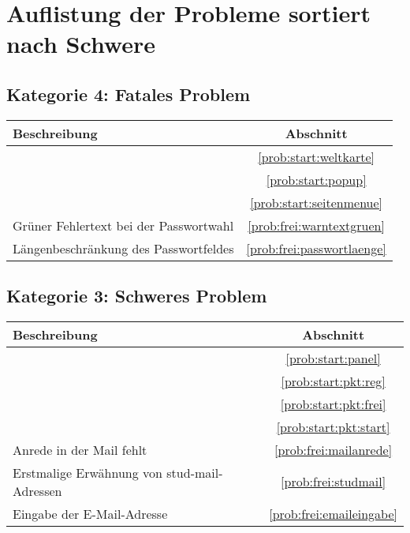 \section{Auflistung der Probleme sortiert nach Schwere}

\subsection*{Kategorie 4: Fatales Problem}
\begin{tabular}{|p{12cm}|c|}
\hline
\textbf{Beschreibung} & \textbf{Abschnitt} \\
\hline\hline
\nameref{prob:start:weltkarte} & \ref{prob:start:weltkarte} \\ 
\nameref{prob:start:popup} & \ref{prob:start:popup}\\
\nameref{prob:start:seitenmenue} & \ref{prob:start:seitenmenue}\\
Grüner Fehlertext bei der Passwortwahl & \ref{prob:frei:warntextgruen}\\
Längenbeschränkung des Passwortfeldes & \ref{prob:frei:passwortlaenge}\\
\hline
\end{tabular}

\subsection*{Kategorie 3: Schweres Problem}
\begin{tabular}{|p{12cm}|c|}
\hline
\textbf{Beschreibung} & \textbf{Abschnitt} \\
\hline\hline
\nameref{prob:start:panel} & \ref{prob:start:panel} \\
\nameref{prob:start:pkt:reg} & \ref{prob:start:pkt:reg}\\
\nameref{prob:start:pkt:frei} & \ref{prob:start:pkt:frei}\\
\nameref{prob:start:pkt:start} & \ref{prob:start:pkt:start}\\
Anrede in der Mail fehlt & \ref{prob:frei:mailanrede}\\
Erstmalige Erwähnung von stud-mail-Adressen & \ref{prob:frei:studmail}\\
Eingabe der E-Mail-Adresse & \ref{prob:frei:emaileingabe}\\
\hline

\end{tabular}

